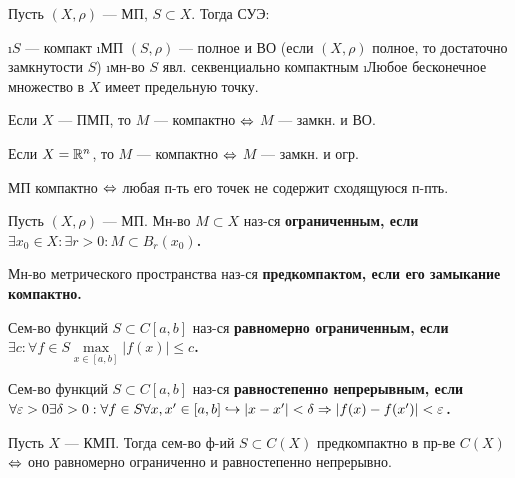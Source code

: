 \begin{thm}
Пусть $(X, \rho)$ --- МП, $S \subset X$. Тогда СУЭ:
\begin{enumerate}
\i $S$ --- компакт
\i МП $(S, \rho)$ --- полное и ВО (если $(X, \rho)$ полное, то достаточно замкнутости $S$)
\i мн-во $S$ явл. секвенциально компактным
\i Любое бесконечное множество в $X$ имеет предельную точку.
\end{enumerate} 
\end{thm}
\begin{cor}
Если $X$ --- ПМП, то $M$ --- компактно $\Leftrightarrow$ $M$ --- замкн. и ВО.
\end{cor}
\begin{cor}
Если $X = \mathbb{R}^n$, то $M$ --- компактно $\Leftrightarrow$ $M$ --- замкн. и огр.
\end{cor}

\begin{thm}
МП компактно $\Leftrightarrow$ любая п-ть его точек не содержит сходящуюся п-пть.
\end{thm}

\begin{defn}
Пусть $(X, \rho)$ --- МП. Мн-во $M \subset X$ наз-ся \bf{ограниченным}, если $\exists x_0 \in X: \exists r > 0: M \subset B_r(x_0)$.
\end{defn}

\begin{defn}
Мн-во метрического пространства наз-ся \bf{предкомпактом}, если его замыкание компактно.
\end{defn}

\begin{defn}
Сем-во функций $S \subset C[a, b]$ наз-ся \bf{равномерно ограниченным}, если $\exists c: \forall f \in S \max\limits_{x \in [a, b]} |f(x)| \le c$.
\end{defn}

\begin{defn}
Сем-во функций $S \subset C[a, b]$ наз-ся \bf{равностепенно непрерывным}, если $\forall \varepsilon > 0 \exists \delta > 0: \forall f \in S \forall x, x' \in [a, b] \hookrightarrow |x-x'| < \delta \Rightarrow |f(x)-f(x')| < \varepsilon$.
\end{defn}

\begin{thm}
Пусть $X$ --- КМП. Тогда сем-во ф-ий $S \subset C(X)$ предкомпактно в пр-ве $C(X)$ $\Leftrightarrow$ оно равномерно ограниченно и равностепенно непрерывно.
\end{thm}

